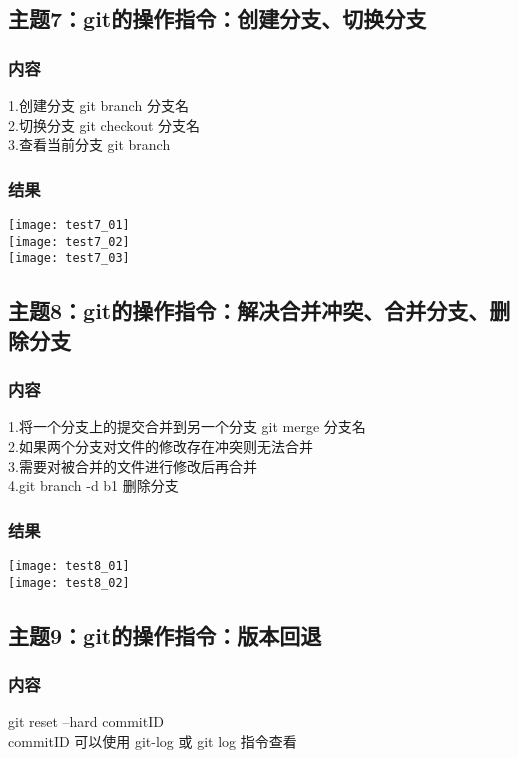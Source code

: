 \documentclass{article}
\begin{document}
\subsection{主题7：git的操作指令：创建分支、切换分支}  
\subsubsection{内容}
1.创建分支 git branch 分支名\\
2.切换分支 git checkout 分支名\\
3.查看当前分支 git branch
\subsubsection{结果}  
\texttt{[image: test7\_01]}\\
\texttt{[image: test7\_02]}\\
\texttt{[image: test7\_03]}\\
\newpage
\thispagestyle{empty}
\subsection{主题8：git的操作指令：解决合并冲突、合并分支、删除分支}  
\subsubsection{内容}
1.将一个分支上的提交合并到另一个分支 git merge 分支名\\
2.如果两个分支对文件的修改存在冲突则无法合并\\
3.需要对被合并的文件进行修改后再合并\\
4.git branch -d b1 删除分支\\
\subsubsection{结果}  
\texttt{[image: test8\_01]}\\
\texttt{[image: test8\_02]}\\
\vspace{1cm}
\subsection{主题9：git的操作指令：版本回退}  
\subsubsection{内容}
git reset --hard commitID\\
commitID 可以使用 git-log 或 git log 指令查看\\
\end{document}
